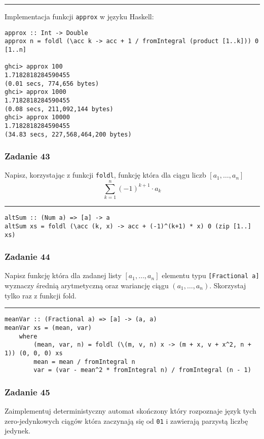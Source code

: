 \documentclass[11pt,a4paper]{article}
\begin{document}
\bigskip
\hrule
\bigskip

Implementacja funkcji \texttt{approx} w języku Haskell:
\begin{Verbatim}[frame=single]
approx :: Int -> Double
approx n = foldl (\acc k -> acc + 1 / fromIntegral (product [1..k])) 0 [1..n]

ghci> approx 100
1.7182818284590455
(0.01 secs, 774,656 bytes)
ghci> approx 1000
1.7182818284590455
(0.08 secs, 211,092,144 bytes)
ghci> approx 10000
1.7182818284590455
(34.83 secs, 227,568,464,200 bytes)
\end{Verbatim}

\subsubsection{Zadanie 43}
Napisz, korzystając z funkcji \texttt{foldl}, funkcję która dla ciągu liczb $[a_1,\dots, a_n]$
\[
    \sum^n_{k=1} (-1)^{k+1} \cdot a_k
\]

\bigskip
\hrule
\bigskip

\begin{Verbatim}[frame=single]
altSum :: (Num a) => [a] -> a
altSum xs = foldl (\acc (k, x) -> acc + (-1)^(k+1) * x) 0 (zip [1..] xs)
\end{Verbatim}

\subsubsection{Zadanie 44}
Napisz funkcję która dla zadanej listy $[a_1,\dots, a_n]$ elementu typu \texttt{[Fractional a]} wyznaczy średnią arytmetyczną oraz wariancję ciągu $(a_1, \dots , a_n)$. Skorzystaj tylko raz z funkcji fold.

\bigskip
\hrule
\bigskip

\begin{Verbatim}[frame=single]
meanVar :: (Fractional a) => [a] -> (a, a)
meanVar xs = (mean, var)
    where
        (mean, var, n) = foldl (\(m, v, n) x -> (m + x, v + x^2, n + 1)) (0, 0, 0) xs
        mean = mean / fromIntegral n
        var = (var - mean^2 * fromIntegral n) / fromIntegral (n - 1)
\end{Verbatim}

\subsubsection{Zadanie 45}
Zaimplementuj deterministyczny automat skończony który rozpoznaje język tych zero-jedynkowych ciągów która zaczynają się od \texttt{01} i zawierają parzystą liczbę jedynek.
\end{document}
